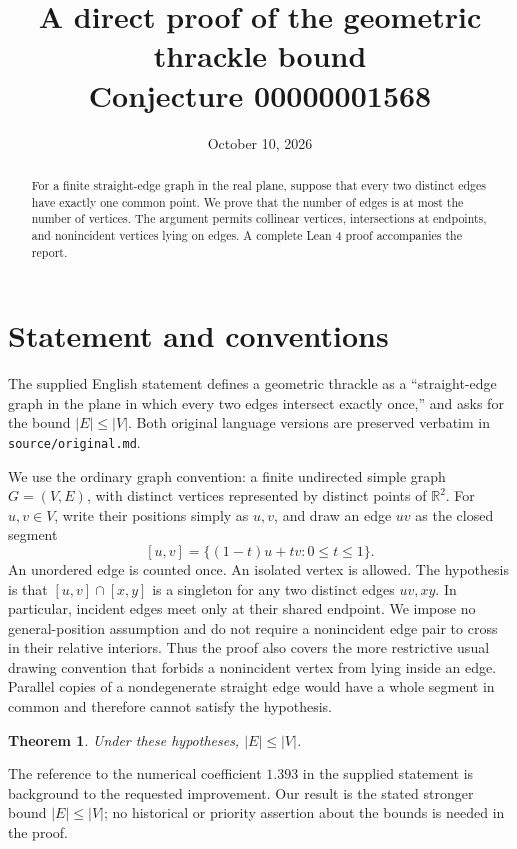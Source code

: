 \documentclass[11pt]{article}
\title{A direct proof of the geometric thrackle bound\\
\large Conjecture 00000001568}
\author{}
\date{October 10, 2026}
\newtheorem{theorem}{Theorem}
\newcommand{\seg}[2]{[#1,#2]}
\begin{document}
\maketitle
\begin{abstract}
For a finite straight-edge graph in the real plane, suppose that every two
distinct edges have exactly one common point. We prove that the number of
edges is at most the number of vertices. The argument permits collinear
vertices, intersections at endpoints, and nonincident vertices lying on
edges. A complete Lean 4 proof accompanies the report.
\end{abstract}

\section{Statement and conventions}
The supplied English statement defines a geometric thrackle as a
``straight-edge graph in the plane in which every two edges intersect
exactly once,'' and asks for the bound $|E|\leq |V|$. Both original language
versions are preserved verbatim in \texttt{source/original.md}.

We use the ordinary graph convention: a finite undirected simple graph
$G=(V,E)$, with distinct vertices represented by distinct points of
$\mathbb R^2$. For $u,v\in V$, write their positions simply as $u,v$, and
draw an edge $uv$ as the closed segment
\[
 \seg uv=\{(1-t)u+tv:0\leq t\leq 1\}.
\]
An unordered edge is counted once. An isolated vertex is allowed.
The hypothesis is that $\seg uv\cap\seg xy$ is a singleton for any two
distinct edges $uv,xy$. In particular, incident edges meet only at their
shared endpoint. We impose no general-position assumption and do not
require a nonincident edge pair to cross in their relative interiors.
Thus the proof also covers the more restrictive usual drawing convention
that forbids a nonincident vertex from lying inside an edge. Parallel
copies of a nondegenerate straight edge would have a whole segment in
common and therefore cannot satisfy the hypothesis.

\begin{theorem}\label{thm:main}
Under these hypotheses, $|E|\leq |V|$.
\end{theorem}

The reference to the numerical coefficient $1.393$ in the supplied
statement is background to the requested improvement. Our result is the
stated stronger bound $|E|\leq |V|$; no historical or priority assertion
about the bounds is needed in the proof.
\end{document}
